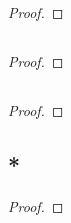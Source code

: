 \subsection{}
\begin{proof}
	
\end{proof}
\subsection{}
\begin{proof}
	
\end{proof}

\subsection{}
\begin{proof}
	
\end{proof}

\subsection{*}
\begin{proof}
	
\end{proof}